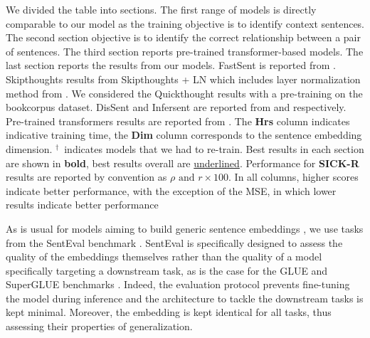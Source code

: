 \begin{table}[!htb]
{We divided the table into sections. The first range of models is directly comparable to our model as the training objective is to identify context sentences. The second section objective is to identify the correct relationship between a pair of sentences. The third section reports pre-trained transformer-based models. The last section reports the results from our models. FastSent is reported from \textcite{hill_16}. Skipthoughts results from \textcite{kiros_15} Skipthoughts + LN which includes layer normalization method from \textcite{ba_16}. We considered the Quickthought results \cite{logeswaran_18} with a pre-training on the bookcorpus dataset. DisSent and Infersent are reported from \textcite{nie_19} and \textcite{conneau_17} respectively. Pre-trained transformers results are reported from \textcite{reimers_19}. The \textbf{Hrs} column indicates indicative training time, the \textbf{Dim} column corresponds to the sentence embedding dimension. $^\dagger$\, indicates models that we had to re-train. Best results in each section are shown in \textbf{bold}, best results overall are \underline{underlined}. Performance for \textbf{SICK-R} results are reported by convention as $\rho \text{ and } r \times 100$. In all columns, higher scores indicate better performance, with the exception of the MSE, in which lower results indicate better performance}
\end{table}

As is usual for models aiming to build generic sentence embeddings \parencite{kiros_15, hill_16, arora_17, conneau_17, logeswaran_18, nie_19}, we use tasks from the SentEval benchmark \parencite{conneau_18}. SentEval is specifically designed to assess the quality of the embeddings themselves rather than the quality of a model specifically targeting a downstream task, as is the case for the GLUE and SuperGLUE benchmarks \parencite{wang_19_glue, wang_19_superglue}. Indeed, the evaluation protocol prevents fine-tuning the model during inference and the architecture to tackle the downstream tasks is kept minimal. Moreover, the embedding is kept identical for all tasks, thus assessing their properties of generalization. 

